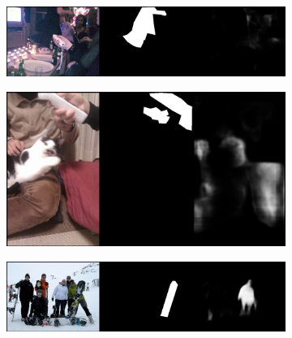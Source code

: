 \begin{figure}[!htbp]
    \centering
    \begin{subfigure}[b]{\columnwidth}
            \centering
            \includegraphics[width=\textwidth]{./figures/unc_plus_samples/1_neg.png}
    \end{subfigure}
    
    \begin{subfigure}[b]{\columnwidth}
            \centering
            \includegraphics[width=\textwidth]{./figures/unc_plus_samples/2_neg.png}
    \end{subfigure}
    
    \begin{subfigure}[b]{\columnwidth}
            \centering
            \includegraphics[width=\textwidth]{./figures/unc_plus_samples/3_neg.png}
    \end{subfigure}
    

\end{figure}
